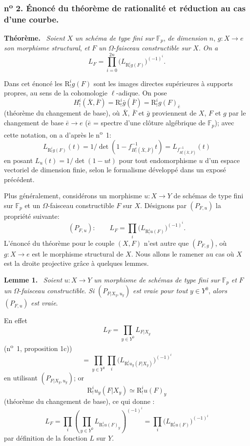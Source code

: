 \documentclass[11pt]{article}
\newenvironment{statement}[1]{\par\medskip\noindent\textbf{#1.}\ }{\par\medskip}
\begin{document}
\subsubsection*{n\textsuperscript{o} 2. Énoncé du théorème de rationalité et réduction au cas d'une courbe.}

\begin{statement}{Théorème}
\emph{Soient} $X$ \emph{un schéma de type fini sur} $\mathbb F_p$, \emph{de dimension} $n$, $g:X\to e$ \emph{son morphisme structural}, \emph{et} $F$ \emph{un} $\Omega$-\emph{faisceau constructible sur} $X$. \emph{On a}
\[
L_F=\prod_{i=0}^{2n}\bigl(L_{\mathrm{R}^i_!g(F)}\bigr)^{(-1)^i}.
\tag{1}
\]
\end{statement}

Dans cet énoncé les $\mathrm{R}^i_!g(F)$ sont les images directes supérieures à supports propres, au sens de la cohomologie $\ell$-adique. On pose
\[
H^i_!(\bar X,\bar F)=\mathrm{R}^i_!\bar g(\bar F)=\mathrm{R}^i_!g(F)_{\bar e}
\]
(théorème du changement de base), où 
$\bar X$, $\bar F$ et $\bar g$
proviennent de $X$, $F$ et $g$ par le changement de base $\bar e\to e$ ($\bar e$ = spectre d'une clôture algébrique de $\mathbb F_p$); avec cette notation, on a d'après le n\textsuperscript{o}~1:
\[
L_{\mathrm{R}^i_!g(F)}(t)=1/\det(1-f^{-1}_{H^i_!(\bar X,\bar F)}t)
 =L_{f^{-1}_{H^i_!(\bar X,\bar F)}}(t)
\]
en posant $L_u(t)=1/\det(1-ut)$ pour tout endomorphisme $u$ d'un espace vectoriel de dimension finie, selon le formalisme développé dans un exposé précédent.

Plus généralement, considérons un morphisme $u:X\to Y$ de schémas de type fini sur $\mathbb F_p$ et un $\Omega$-faisceau constructible $F$ sur $X$. Désignons par $(P_{F,u})$ la propriété suivante:
\[
(P_{F,u}):\qquad
L_F=\prod_i\bigl(L_{\mathrm{R}^i_!u(F)}\bigr)^{(-1)^i}.
\]
L'énoncé du théorème pour le couple $(X,F)$ n'est autre que $(P_{F,g})$, où $g:X\to e$ est le morphisme structural de $X$. Nous allons le ramener au cas où $X$ est la droite projective grâce à quelques lemmes.

\begin{statement}{Lemme 1}
\emph{Soient} $u:X\to Y$ \emph{un morphisme de schémas de type fini sur} $\mathbb F_p$ \emph{et} $F$ \emph{un} $\Omega$-\emph{faisceau constructible}. \emph{Si} $(P_{F|X_y,u_y})$ \emph{est vraie pour tout} $y\in Y^0$, \emph{alors} $(P_{F,u})$ \emph{est vraie}.
\end{statement}

En effet
\[
L_F=\prod_{y\in Y^0}L_{F|X_y}
\]
(n\textsuperscript{o}~1, proposition 1c))
\[
=\prod_{y\in Y^0}\prod_i\bigl(L_{\mathrm{R}^i_!u_y(F|X_y)}\bigr)^{(-1)^i}
\]
en utilisant $(P_{F|X_y,u_y})$; or
\[
\mathrm{R}^i_!u_y(F|X_y)\simeq \mathrm{R}^i_!u(F)_y
\]
(théorème du changement de base), ce qui 
donne :
\[
L_F=\prod_i\left(\prod_{y\in Y^0}L_{\mathrm{R}^i_!u(F)_y}\right)^{(-1)^i}
=\prod_i\bigl(L_{\mathrm{R}^i_!u(F)}\bigr)^{(-1)^i}
\]
par
définition de la fonction $L$ sur $Y$.
\end{document}
